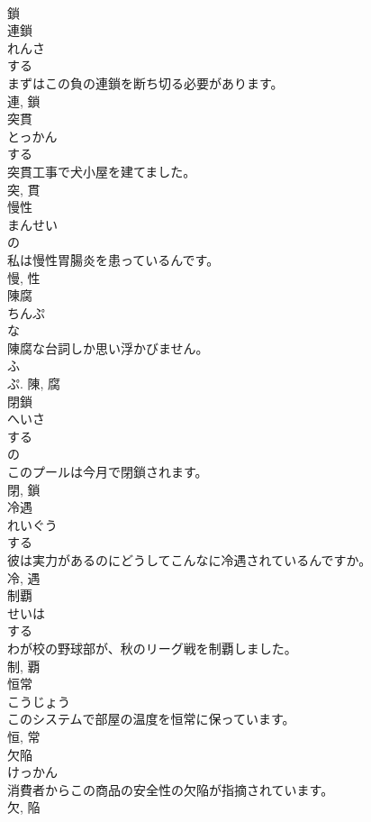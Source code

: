 \documentclass[8pt]{extreport}
\begin{document}
\begin{CJK}{UTF8}{min}
\\	鎖	
\\	連鎖	
\\	れんさ	
\\	する 
\\	まずはこの負の連鎖を断ち切る必要があります。	
\\	連, 鎖	
\\	突貫	
\\	とっかん	
\\	する 
\\	突貫工事で犬小屋を建てました。	
\\	突, 貫	
\\	慢性	
\\	まんせい	
\\	の 
\\	私は慢性胃腸炎を患っているんです。	
\\	慢, 性	
\\	陳腐	
\\	ちんぷ	
\\	な 
\\	陳腐な台詞しか思い浮かびません。	
\\	ふ 
\\	ぷ.	陳, 腐	
\\	閉鎖	
\\	へいさ	
\\	する 
\\	の 
\\	このプールは今月で閉鎖されます。	
\\	閉, 鎖	
\\	冷遇	
\\	れいぐう	
\\	する 
\\	彼は実力があるのにどうしてこんなに冷遇されているんですか。	
\\	冷, 遇	
\\	制覇	
\\	せいは	
\\	する 
\\	わが校の野球部が、秋のリーグ戦を制覇しました。	
\\	制, 覇	
\\	恒常	
\\	こうじょう	
\\	このシステムで部屋の温度を恒常に保っています。	
\\	恒, 常	
\\	欠陥	
\\	けっかん	
\\	消費者からこの商品の安全性の欠陥が指摘されています。	
\\	欠, 陥	

\end{CJK}
\end{document}
